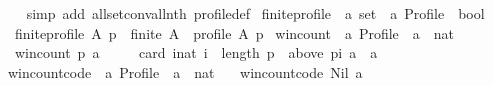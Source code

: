 \begin{isabellebody}
%
\isadelimproof
\ \ %
\endisadelimproof
%
\isatagproof
{}\isamarkupfalse%
\ {\isacharparenleft}{\kern0pt}simp\ add{\isacharcolon}{\kern0pt}\ all{\isacharunderscore}{\kern0pt}set{\isacharunderscore}{\kern0pt}conv{\isacharunderscore}{\kern0pt}all{\isacharunderscore}{\kern0pt}nth\ profile{\isacharunderscore}{\kern0pt}def{\isacharparenright}{\kern0pt}%
\endisatagproof
{\isafoldproof}%
%
\isadelimproof
\isanewline
%
\endisadelimproof
\isanewline
{}\isamarkupfalse%
\ finite{\isacharunderscore}{\kern0pt}profile\ {\isacharcolon}{\kern0pt}{\isacharcolon}{\kern0pt}\ {\isachardoublequoteopen}{\isacharprime}{\kern0pt}a\ set\ {\isasymRightarrow}\ {\isacharprime}{\kern0pt}a\ Profile\ {\isasymRightarrow}\ bool{\isachardoublequoteclose}\ \isanewline
\ \ {\isachardoublequoteopen}finite{\isacharunderscore}{\kern0pt}profile\ A\ p\ {\isasymequiv}\ finite\ A\ {\isasymand}\ profile\ A\ p{\isachardoublequoteclose}%
\isadelimdocument
%
\endisadelimdocument
%
\isatagdocument
%
\isamarkuptrue%
%
\endisatagdocument
{\isafolddocument}%
%
\isadelimdocument
%
\endisadelimdocument
{}\isamarkupfalse%
\ win{\isacharunderscore}{\kern0pt}count\ {\isacharcolon}{\kern0pt}{\isacharcolon}{\kern0pt}\ {\isachardoublequoteopen}{\isacharprime}{\kern0pt}a\ Profile\ {\isasymRightarrow}\ {\isacharprime}{\kern0pt}a\ {\isasymRightarrow}\ nat{\isachardoublequoteclose}\ \isanewline
\ \ {\isachardoublequoteopen}win{\isacharunderscore}{\kern0pt}count\ p\ a\ {\isacharequal}{\kern0pt}\isanewline
\ \ \ \ card\ {\isacharbraceleft}{\kern0pt}i{\isacharcolon}{\kern0pt}{\isacharcolon}{\kern0pt}nat{\isachardot}{\kern0pt}\ i\ {\isacharless}{\kern0pt}\ length\ p\ {\isasymand}\ above\ {\isacharparenleft}{\kern0pt}p{\isacharbang}{\kern0pt}i{\isacharparenright}{\kern0pt}\ a\ {\isacharequal}{\kern0pt}\ {\isacharbraceleft}{\kern0pt}a{\isacharbraceright}{\kern0pt}{\isacharbraceright}{\kern0pt}{\isachardoublequoteclose}\isanewline
\isanewline
{}\isamarkupfalse%
\ win{\isacharunderscore}{\kern0pt}count{\isacharunderscore}{\kern0pt}code\ {\isacharcolon}{\kern0pt}{\isacharcolon}{\kern0pt}\ {\isachardoublequoteopen}{\isacharprime}{\kern0pt}a\ Profile\ {\isasymRightarrow}\ {\isacharprime}{\kern0pt}a\ {\isasymRightarrow}\ nat{\isachardoublequoteclose}\ \isanewline
\ \ {\isachardoublequoteopen}win{\isacharunderscore}{\kern0pt}count{\isacharunderscore}{\kern0pt}code\ Nil\ a\ {\isacharequal}{\kern0pt}\ {}{\isachardoublequoteclose}\ {\isacharbar}{\kern0pt}\isanewline

\end{isabellebody}
